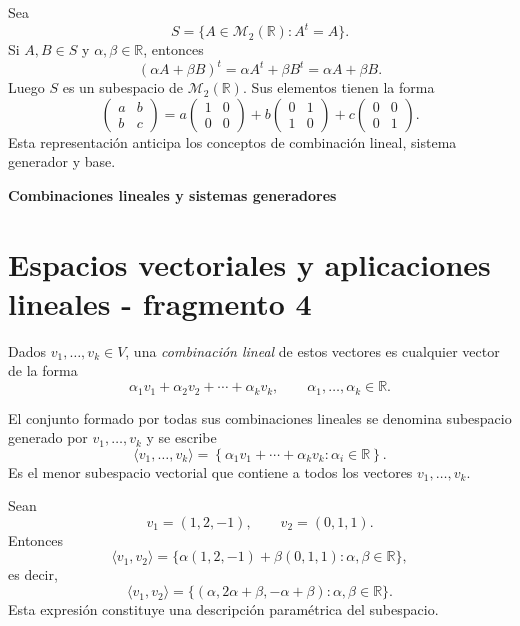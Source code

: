 \begin{example}
Sea
\[
S=\{A\in\mathcal M_2(\mathbb{R}):A^t=A\}.
\]
Si $A,B\in S$ y $\alpha,\beta\in\mathbb{R}$, entonces
\[
(\alpha A+\beta B)^t
=\alpha A^t+\beta B^t
=\alpha A+\beta B.
\]
Luego $S$ es un subespacio de $\mathcal M_2(\mathbb{R})$. Sus elementos tienen la forma
\[
\begin{pmatrix}
a&b\\
b&c
\end{pmatrix}
=
a\begin{pmatrix}1&0\\0&0\end{pmatrix}
+b\begin{pmatrix}0&1\\1&0\end{pmatrix}
+c\begin{pmatrix}0&0\\0&1\end{pmatrix}.
\]
Esta representación anticipa los conceptos de combinación lineal, sistema generador y base.
\end{example}

\textbf{Combinaciones lineales y sistemas generadores}


\section{Espacios vectoriales y aplicaciones lineales - fragmento 4}
\begin{definition}
Dados $v_1,\ldots,v_k\in V$, una \emph{combinación lineal} de estos vectores es cualquier vector de la forma
\[
\alpha_1v_1+\alpha_2v_2+\cdots+\alpha_kv_k,
\qquad
\alpha_1,\ldots,\alpha_k\in\mathbb{R}.
\]
\end{definition}

El conjunto formado por todas sus combinaciones lineales se denomina subespacio generado por $v_1,\ldots,v_k$ y se escribe
\[
\langle v_1,\ldots,v_k\rangle
=
\left\{
\alpha_1v_1+\cdots+\alpha_kv_k:
\alpha_i\in\mathbb{R}
\right\}.
\]
Es el menor subespacio vectorial que contiene a todos los vectores $v_1,\ldots,v_k$.

\begin{example}
Sean
\[
v_1=(1,2,-1),
\qquad
v_2=(0,1,1).
\]
Entonces
\[
\langle v_1,v_2\rangle
=
\{\alpha(1,2,-1)+\beta(0,1,1):\alpha,\beta\in\mathbb{R}\},
\]
es decir,
\[
\langle v_1,v_2\rangle
=
\{(\alpha,2\alpha+\beta,-\alpha+\beta):\alpha,\beta\in\mathbb{R}\}.
\]
Esta expresión constituye una descripción paramétrica del subespacio.
\end{example}

